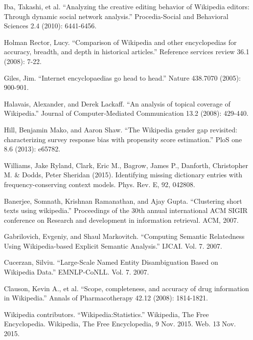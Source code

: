 \documentclass[pre,twocolumn,twoside,superscriptaddress,floatfix, aps, 10pt]{revtex4-1}
\begin{document}
\begin{thebibliography}{1}

       Iba, Takashi, et al. ``Analyzing the creative editing behavior of Wikipedia editors: Through dynamic social network analysis.'' Procedia-Social and Behavioral Sciences 2.4 (2010): 6441-6456.

       Holman Rector, Lucy. ``Comparison of Wikipedia and other encyclopedias for accuracy, breadth, and depth in historical articles.'' Reference services review 36.1 (2008): 7-22.

       Giles, Jim. ``Internet encyclopaedias go head to head.'' Nature 438.7070 (2005): 900-901.

        Halavais, Alexander, and Derek Lackaff. ``An analysis of topical coverage of Wikipedia.'' Journal of Computer‐Mediated Communication 13.2 (2008): 429-440.

         Hill, Benjamin Mako, and Aaron Shaw. ``The Wikipedia gender gap revisited: characterizing survey response bias with propensity score estimation.'' PloS one 8.6 (2013): e65782.

       Williams, Jake Ryland, Clark, Eric M., Bagrow, James P., Danforth, Christopher M. \& Dodds, Peter Sheridan (2015). Identifying missing dictionary entries with frequency-conserving context models. Phys. Rev. E, 92, 042808.

       Banerjee, Somnath, Krishnan Ramanathan, and Ajay Gupta. ``Clustering short texts using wikipedia.'' Proceedings of the 30th annual international ACM SIGIR conference on Research and development in information retrieval. ACM, 2007.

       Gabrilovich, Evgeniy, and Shaul Markovitch. ``Computing Semantic Relatedness Using Wikipedia-based Explicit Semantic Analysis.'' IJCAI. Vol. 7. 2007.

       Cucerzan, Silviu. ``Large-Scale Named Entity Disambiguation Based on Wikipedia Data.'' EMNLP-CoNLL. Vol. 7. 2007.

       Clauson, Kevin A., et al. ``Scope, completeness, and accuracy of drug information in Wikipedia.'' Annals of Pharmacotherapy 42.12 (2008): 1814-1821.

       Wikipedia contributors. ``Wikipedia:Statistics.'' Wikipedia, The Free Encyclopedia. Wikipedia, The Free Encyclopedia, 9 Nov. 2015. Web. 13 Nov. 2015.


\end{thebibliography}
\end{document}

